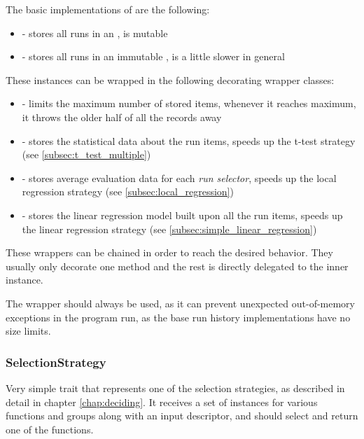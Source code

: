 The basic implementations of  are the following:
\begin{itemize}
	\item {} - stores all runs in an , is mutable
	\item {} - stores all runs in an immutable , is a little slower in general
\end{itemize}

These instances can be wrapped in the following decorating wrapper classes:
\begin{itemize}
	\item {} - limits the maximum number of stored items, whenever it reaches maximum, it throws the older half of all the records away
	\item {} - stores the statistical data about the run items, speeds up the t-test strategy (see \ref{subsec:t_test_multiple})
	\item {} - stores average evaluation data for each \textit{run selector}, speeds up the local regression strategy (see \ref{subsec:local_regression})
	\item {} - stores the linear regression model built upon all the run items, speeds up the linear regression strategy (see \ref{subsec:simple_linear_regression})
\end{itemize}

These wrappers can be chained in order to reach the desired behavior. They usually only decorate one method and the rest is directly delegated to the inner instance.

The  wrapper should always be used, as it can prevent unexpected out-of-memory exceptions in the program run, as the base run history implementations have no size limits.

\subsubsection{SelectionStrategy}
\label{subsubsec:selection_strategy_impl}

Very simple trait that represents one of the selection strategies, as described in detail in chapter \ref{chap:deciding}. It receives a set of  instances for various functions and groups along with an input descriptor, and should select and return one of the functions. 

